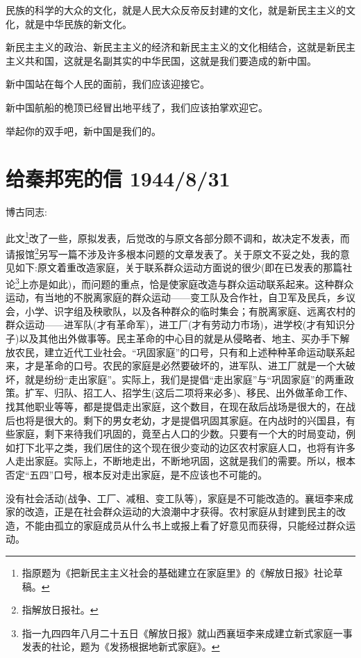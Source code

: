 \documentclass[UTF8, 12pt, a4paper]{ctexrep}
\begin{document}
民族的科学的大众的文化，就是人民大众反帝反封建的文化，就是新民主主义的文化，就是中华民族的新文化。

新民主主义的政治、新民主主义的经济和新民主主义的文化相结合，这就是新民主主义共和国，这就是名副其实的中华民国，这就是我们要造成的新中国。

新中国站在每个人民的面前，我们应该迎接它。

新中国航船的桅顶已经冒出地平线了，我们应该拍掌欢迎它。

举起你的双手吧，新中国是我们的。

\section{给秦邦宪的信 1944/8/31}

博古同志:

此文\footnote{指原题为《把新民主主义社会的基础建立在家庭里》的《解放日报》社论草稿。}改了一些，原拟发表，后觉改的与原文各部分颇不调和，故决定不发表，而请报馆\footnote{指解放日报社。}另写一篇不涉及许多根本问题的文章发表了。关于原文不妥之处，我的意见如下:原文着重改造家庭，关于联系群众运动方面说的很少(即在已发表的那篇社论\footnote{指一九四四年八月二十五日《解放日报》就山西襄垣李来成建立新式家庭一事发表的社论，题为《发扬根据地新式家庭》。}上亦是如此)，而问题的重点，恰是使家庭改造与群众运动联系起来。这种群众运动，有当地的不脱离家庭的群众运动——变工队及合作社，自卫军及民兵，乡议会，小学、识字组及秧歌队，以及各种群众的临时集会；有脱离家庭、远离农村的群众运动——进军队(才有革命军)，进工厂(才有劳动力市场)，进学校(才有知识分子)以及其他出外做事等。民主革命的中心目的就是从侵略者、地主、买办手下解放农民，建立近代工业社会。“巩固家庭”的口号，只有和上述种种革命运动联系起来，才是革命的口号。农民的家庭是必然要破坏的，进军队、进工厂就是一个大破坏，就是纷纷“走出家庭”。实际上，我们是提倡“走出家庭”与“巩固家庭”的两重政策。扩军、归队、招工人、招学生(这后二项将来必多)、移民、出外做革命工作、找其他职业等等，都是提倡走出家庭，这个数目，在现在敌后战场是很大的，在战后也将是很大的。剩下的男女老幼，才是提倡巩固其家庭。在内战时的兴国县，有些家庭，剩下来待我们巩固的，竟至占人口的少数。只要有一个大的时局变动，例如打下北平之类，我们居住的这个现在很少变动的边区农村家庭人口，也将有许多人走出家庭。实际上，不断地走出，不断地巩固，这就是我们的需要。所以，根本否定“五四”口号，根本反对走出家庭，是不应该也不可能的。

没有社会活动(战争、工厂、减租、变工队等)，家庭是不可能改造的。襄垣李来成家的改造，正是在社会群众运动的大浪潮中才获得。农村家庭从封建到民主的改造，不能由孤立的家庭成员从什么书上或报上看了好意见而获得，只能经过群众运动。
\end{document}
